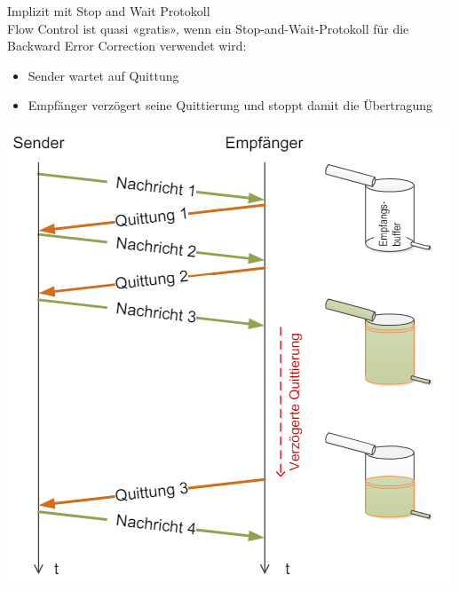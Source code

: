 \begin{definition}{Implizit mit Stop and Wait Protokoll}\\
    Flow Control ist quasi «gratis», wenn ein Stop-and-Wait-Protokoll für die Backward Error Correction verwendet wird:
    \begin{itemize}
        \item Sender wartet auf Quittung
        \item Empfänger verzögert seine Quittierung und stoppt damit die Übertragung
    \end{itemize}
        \includegraphics[width=0.5\linewidth]{images/flow_control2.png}
\end{definition}

